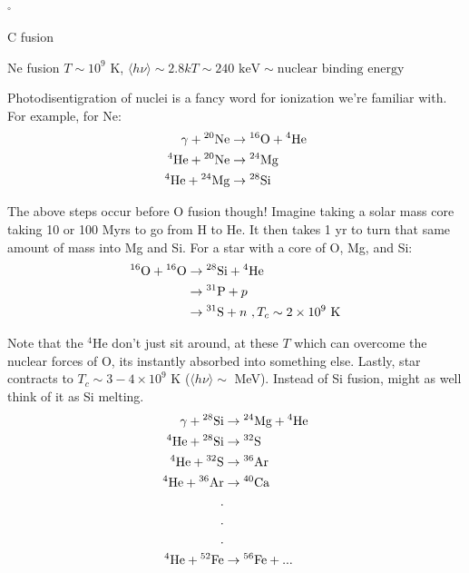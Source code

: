 \begin{list}{$^\circ$}{}
\item C fusion
\item Ne fusion $T \sim 10^9$ K, $\langle h \nu\rangle \sim 2.8 kT \sim 240 \textrm{ keV} \sim \textrm{nuclear binding energy}$
\end{list}

Photodisentigration of nuclei is a fancy word for ionization we're familiar with. For example, for Ne:
\begin{align}
\gamma + \textrm{$^{20}$Ne} &\rightarrow \textrm{$^{16}$O}+ \textrm{$^{4}$He}\\
\textrm{$^{4}$He} + \textrm{$^{20}$Ne} &\rightarrow \textrm{$^{24}$Mg}\\
\textrm{$^{4}$He} + \textrm{$^{24}$Mg} &\rightarrow \textrm{$^{28}$Si}
\end{align}

The above steps occur before O fusion though! Imagine taking a solar mass core taking 10 or 100 Myrs to go from H to He. It then takes 1 yr to turn that same amount of mass into Mg and Si. For a star with a core of O, Mg, and Si:
\begin{align}
\textrm{$^{16}$O} + \textrm{$^{16}$O} &\rightarrow \textrm{$^{28}$Si} + \textrm{$^{4}$He}\\
 &\rightarrow \textrm{$^{31}$P} + p\\
 &\rightarrow \textrm{$^{31}$S} + n~, T_c \sim 2 \times 10^9 \textrm{ K}
\end{align}

Note that the $^4$He don't just sit around, at these $T$ which can overcome the nuclear forces of O, its instantly absorbed into something else.  Lastly, star contracts to $T_c \sim 3 -4 \times 10^9$ K ($\langle h\nu\rangle \sim $ MeV). Instead of Si fusion, might as well think of it as Si melting. 
\begin{align}
\gamma + \textrm{$^{28}$Si} &\rightarrow \textrm{$^{24}$Mg}+ \textrm{$^{4}$He}\\
\textrm{$^{4}$He} + \textrm{$^{28}$Si} &\rightarrow \textrm{$^{32}$S}\\
\textrm{$^{4}$He} + \textrm{$^{32}$S} &\rightarrow \textrm{$^{36}$Ar}\\
\textrm{$^{4}$He} + \textrm{$^{36}$Ar} &\rightarrow \textrm{$^{40}$Ca}\\
.\\
.\\
.\\
\textrm{$^{4}$He} +\textrm{$^{52}$Fe} &\rightarrow \textrm{$^{56}$Fe} + ...
\end{align}

